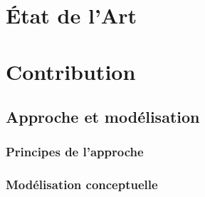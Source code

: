 










\part*{État de l'Art}
















\part*{Contribution}

\chapter{Approche et modélisation}\label{chap:mod}
\minitoc
\section{Principes de l'approche}\label{sec:principes}
\section{Modélisation conceptuelle}\label{sec:concept}

